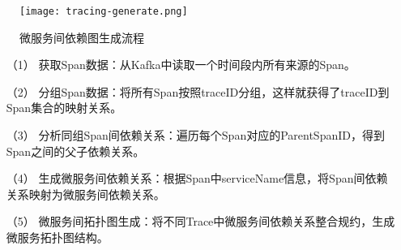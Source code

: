 
\begin{figure}[htbp]
    \centering
    \texttt{[image: tracing-generate.png]}
    \caption{微服务间依赖图生成流程\label{tracing-generate}}
\end{figure}

\begin{itemize}
    \item [（1）]获取Span数据：从Kafka中读取一个时间段内所有来源的Span。
    \item [（2）]分组Span数据：将所有Span按照traceID分组，这样就获得了traceID到Span集合的映射关系。
    \item [（3）]分析同组Span间依赖关系：遍历每个Span对应的ParentSpanID，得到Span之间的父子依赖关系。
    \item [（4）]生成微服务间依赖关系：根据Span中serviceName信息，将Span间依赖关系映射为微服务间依赖关系。
    \item [（5）]微服务间拓扑图生成：将不同Trace中微服务间依赖关系整合规约，生成微服务拓扑图结构。
\end{itemize}

